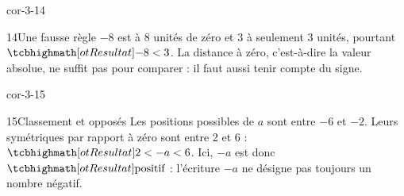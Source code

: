 \begin{blocLivre}{cor-3-14}\begin{corrige}{14}{Une fausse règle}
$-8$ est à 8 unités de zéro et 3 à seulement 3 unités, pourtant $\res{-8<3}$. La distance à zéro, c’est-à-dire la valeur absolue, ne suffit pas pour comparer : il faut aussi tenir compte du signe.
\end{corrige}\end{blocLivre}
\begin{blocLivre}{cor-3-15}\begin{corrige}{15}{Classement et opposés}
Les positions possibles de $a$ sont entre $-6$ et $-2$. Leurs symétriques par rapport à zéro sont entre 2 et 6 : $\res{2<-a<6}$. Ici, $-a$ est donc $\res{\text{positif}}$ : l’écriture $-a$ ne désigne pas toujours un nombre négatif.
\label{fig-cor-3-15}
\end{corrige}\end{blocLivre}
